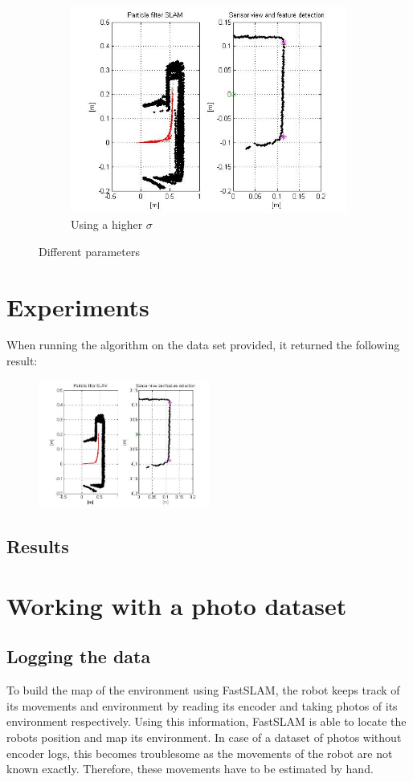 \documentclass[12pt]{article}
\begin{document}
\begin{figure}[h!]
\begin{subfigure}[b]{0.3\textwidth}
		\includegraphics[width=\textwidth]{sigma_chance.jpg}
		\caption{Using a higher $\sigma$}
	\end{subfigure}
	\caption{Different parameters}
	\label{fig:tweaks}
\end{figure}
\section{Experiments}
When running the algorithm on the data set provided, it returned the following result:
\begin{figure}[h!]
	\centering
	\includegraphics[width=0.5\textwidth]{normal.jpg}
\end{figure}

\subsection{Results}

\section{Working with a photo dataset}
\subsection{Logging the data}
To build the map of the environment using FastSLAM, the robot keeps track of its movements and environment by reading its encoder and taking photos of its environment respectively. Using this information, FastSLAM is able to locate the robots position and map its environment. In case of a dataset of photos without encoder logs, this becomes troublesome as the movements of the robot are not known exactly. Therefore, these movements have to be estimated by hand.
\end{document}
